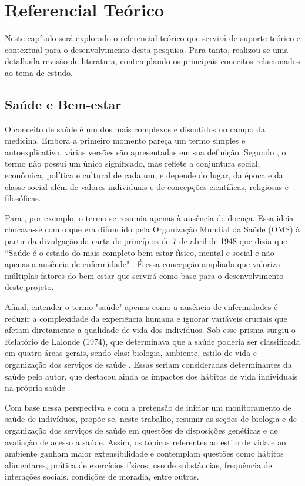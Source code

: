 \chapter{Referencial Teórico}

Neste capítulo será explorado o referencial teórico que servirá de suporte teórico e contextual para o desenvolvimento desta pesquisa. Para tanto, realizou-se uma detalhada revisão de literatura, contemplando os principais conceitos relacionados ao tema de estudo. 

\section{Saúde e Bem-estar}

O conceito de saúde é um dos mais complexos e discutidos no campo da medicina. Embora a primeiro momento pareça um termo simples e autoexplicativo, várias versões são apresentadas em sua definição. Segundo , o termo não possui um único significado, mas reflete a conjuntura social, econômica, política e cultural de cada um, e depende do lugar, da época e da classe social além de valores individuais e de concepções científicas, religiosas e filosóficas.

Para , por exemplo, o termo se resumia apenas à ausência de doença. Essa ideia chocava-se com o que era difundido pela Organização Mundial da Saúde (OMS) à partir da divulgação da carta de princípios de 7 de abril de 1948 que dizia que “Saúde é o estado do mais completo bem-estar físico, mental e social e não apenas a ausência de enfermidade" \cite{moacyr_scliar_2007}. É essa concepção ampliada que valoriza múltiplas fatores do bem-estar que servirá como base para o desenvolvimento deste projeto.

Afinal, entender o termo "saúde" apenas como a ausência de enfermidades é reduzir a complexidade da experiência humana e ignorar variáveis cruciais que afetam diretamente a qualidade de vida dos indivíduos. Sob esse prisma surgiu o Relatório de Lalonde (1974), que determinava que a saúde poderia ser classificada em quatro áreas gerais, sendo elas: biologia, ambiente, estilo de vida e organização dos serviços de saúde \cite{lalonde}. Essas seriam consideradas determinantes da saúde pelo autor, que destacou ainda os impactos dos hábitos de vida individuais na própria saúde \cite{lalonde}.

Com base nessa perspectiva e com a pretensão de iniciar um monitoramento de saúde de indivíduos, propõe-se, neste trabalho, resumir as seções de biologia e de organização dos serviços de saúde em questões de disposições genéticas e de avaliação de acesso a saúde. Assim, os tópicos referentes ao estilo de vida e ao ambiente ganham maior extensibilidade e contemplam questões como hábitos alimentares, prática de exercícios físicos, uso de substâncias, frequência de interações sociais, condições de moradia, entre outros.

